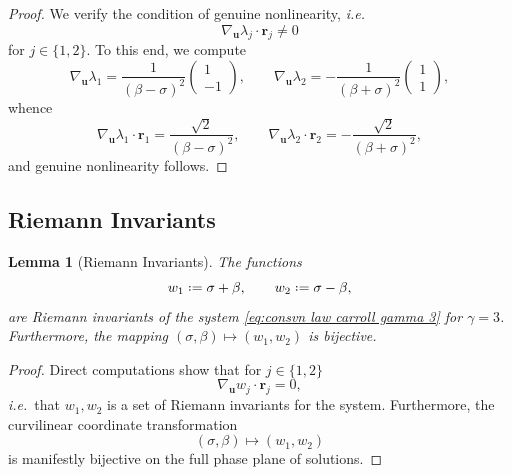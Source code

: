 \documentclass[11pt,a4paper,reqno]{amsart}
\numberwithin{equation}{section}
\newtheorem{lemma}{Lemma}[section]
\theoremstyle{definition}
\theoremstyle{remark}
\newcommand{\bu}{\mathbf{u}}
\newcommand{\br}{\mathbf{r}}
\newcommand*{\defeq}{\mathrel{\vcenter{\baselineskip0.5ex \lineskiplimit0pt
                     \hbox{\scriptsize.}\hbox{\scriptsize.}}}%
                     =}
\begin{document}
{\begin{proof}
We verify the condition of genuine nonlinearity, \textit{i.e.}
\begin{equation*}
    \nabla_\bu \lambda_j \cdot \br_j \neq 0 
\end{equation*}
for $j \in \{ 1, 2 \}$. To this end, we compute 
\begin{equation*}
    \nabla_\bu \lambda_1 = \frac{1}{(\beta-\sigma)^2}\left(  \begin{matrix}
        1 \\ 
        -1
    \end{matrix}\right), \qquad \nabla_\bu \lambda_2 = -\frac{1}{(\beta+\sigma)^2}\left(  \begin{matrix}
        1 \\ 
        1
    \end{matrix}\right), 
\end{equation*}
whence 
\begin{equation*}
    \nabla_\bu \lambda_1 \cdot \br_1 = \frac{\sqrt{2}}{(\beta-\sigma)^2}, \qquad \nabla_\bu \lambda_2 \cdot \br_2 = -\frac{\sqrt{2}}{(\beta+\sigma)^2}, 
\end{equation*}
and genuine nonlinearity follows. 
\end{proof}

\subsection{Riemann Invariants}\label{sec:riemann invariants} 

\begin{lemma}[Riemann Invariants]\label{lem:riemann invariants}
    The functions 
    \begin{equation}\label{eq:riemann invariants}
    w_1  \defeq  \sigma+\beta    , \qquad    w_2  \defeq   \sigma-\beta   , 
\end{equation}
are Riemann invariants of the system \eqref{eq:consvn law carroll gamma 3} for $\gamma=3$. Furthermore, the mapping $(\sigma,\beta) \mapsto (w_1,w_2)$ is bijective. 
\end{lemma}


\begin{proof}
Direct computations show that for $j \in \{1, 2\}$
\begin{equation*}
    \nabla_{\bu}w_j \cdot \br_j = 0,
\end{equation*}
\emph{i.e.}~that $w_1,w_2$ is a set of Riemann invariants for the system. Furthermore, the curvilinear coordinate transformation 
\begin{equation*}
    (\sigma,\beta) \longmapsto (w_1,w_2) 
\end{equation*}
is manifestly bijective on the full phase plane of solutions. 
\end{proof}

}
\end{document}
